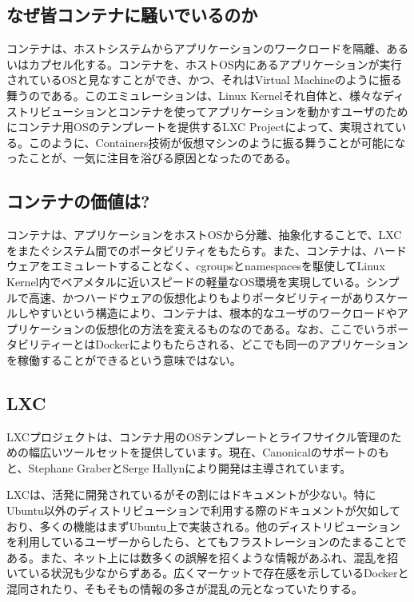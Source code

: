 \documentclass[9pt,b5paper,tombo]{jsbook}
\begin{document}
\newpage

\subsection{なぜ皆コンテナに騒いでいるのか}
コンテナは、ホストシステムからアプリケーションのワークロードを隔離、あるいはカプセル化する。コンテナを、ホストOS内にあるアプリケーションが実行されているOSと見なすことができ、かつ、それはVirtual Machineのように振る舞うのである。このエミュレーションは、Linux Kernelそれ自体と、様々なディストリビューションとコンテナを使ってアプリケーションを動かすユーザのためにコンテナ用OSのテンプレートを提供するLXC Projectによって、実現されている。このように、Containers技術が仮想マシンのように振る舞うことが可能になったことが、一気に注目を浴びる原因となったのである。

\subsection{コンテナの価値は?}
コンテナは、アプリケーションをホストOSから分離、抽象化することで、LXCをまたぐシステム間でのポータビリティをもたらす。また、コンテナは、ハードウェアをエミュレートすることなく、cgroupsとnamespacesを駆使してLinux Kernel内でベアメタルに近いスピードの軽量なOS環境を実現している。シンプルで高速、かつハードウェアの仮想化よりもよりポータビリティーがありスケールしやすいという構造により、コンテナは、根本的なユーザのワークロードやアプリケーションの仮想化の方法を変えるものなのである。なお、ここでいうポータビリティーとはDockerによりもたらされる、どこでも同一のアプリケーションを稼働することができるという意味ではない。

\subsection{LXC}
LXCプロジェクトは、コンテナ用のOSテンプレートとライフサイクル管理のための幅広いツールセットを提供しています。現在、Canonicalのサポートのもと、Stephane GraberとSerge Hallynにより開発は主導されています。

LXCは、活発に開発されているがその割にはドキュメントが少ない。特にUbuntu以外のディストリビューションで利用する際のドキュメントが欠如しており、多くの機能はまずUbuntu上で実装される。他のディストリビューションを利用しているユーザーからしたら、とてもフラストレーションのたまることである。また、ネット上には数多くの誤解を招くような情報があふれ、混乱を招いている状況も少なからずある。広くマーケットで存在感を示しているDockerと混同されたり、そもそもの情報の多さが混乱の元となっていたりする。
\end{document}

